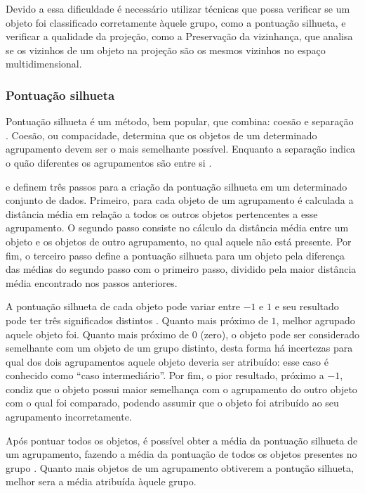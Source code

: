 			Devido a essa dificuldade é necessário utilizar técnicas que possa verificar
			se um objeto foi classificado corretamente àquele grupo, como a pontuação
			silhueta, e verificar a qualidade da projeção, como a Preservação da vizinhança,
			que analisa se os vizinhos de um objeto na projeção são os mesmos vizinhos
			no espaço multidimensional.
			
			\subsubsection{Pontuação silhueta}

				Pontuação silhueta é um método, bem popular, que combina: coesão e separação
				\cite{Tan:2005:ch8}. Coesão, ou compacidade, determina que os objetos
				de um determinado agrupamento devem ser o mais semelhante possível. Enquanto
				a separação indica o quão diferentes os agrupamentos são entre si
				\cite{Tan:2005:ch8, Berry:1997:DMT:560675}.
				
				 e  definem
				três passos para a criação da pontuação silhueta em um determinado conjunto
				de dados. Primeiro, para cada objeto de um agrupamento é calculada a distância
				média em relação a todos os outros objetos pertencentes a esse agrupamento.
				O segundo passo consiste no cálculo da distância média entre um objeto e 
				os objetos de outro agrupamento, no qual aquele não está presente. Por fim, o
				terceiro passo define a pontuação silhueta para um objeto pela diferença das
				médias do segundo passo com o primeiro passo, dividido pela maior distância média
				encontrado nos passos anteriores.
				
				A pontuação silhueta de cada objeto pode variar entre $-1$ e $1$ e seu resultado
				pode ter três significados distintos \cite{rousseeuw1987silhouettes}.
				Quanto mais próximo de $1$, melhor agrupado aquele objeto foi. Quanto mais
				próximo de $0$ (zero), o objeto pode ser considerado semelhante com um objeto
				de um grupo distinto, desta forma há incertezas para qual dos dois agrupamentos
				aquele objeto deveria ser atribuído: esse caso é conhecido como ``caso intermediário''.
				Por fim, o pior resultado, próximo a $-1$, condiz que o objeto possui maior
				semelhança com o agrupamento do outro objeto com o qual foi comparado, podendo
				assumir que o objeto foi atribuído ao seu agrupamento incorretamente.
				
				Após pontuar todos os objetos, é possível obter a média da pontuação silhueta
				de um agrupamento, fazendo a média da pontuação de todos os objetos
				presentes no grupo \cite{Tan:2005:ch8}. Quanto mais objetos de um agrupamento
				obtiverem a pontução silhueta, melhor sera a média atribuída àquele grupo.
				
